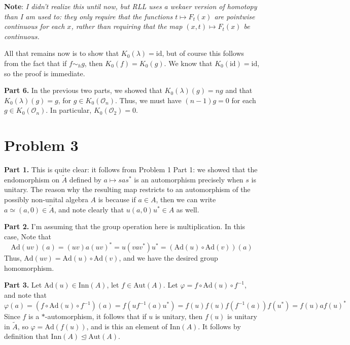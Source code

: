 \documentclass[aps,pra,showpacs,notitlepage,onecolumn,superscriptaddress,nofootinbib]{revtex4-1}
\newcommand{\hhrulefill}{\hspace{-1.0em}\hrulefill}
\theoremstyle{definition}
\begin{document}
\noindent \textbf{Note}: \emph{I didn't realize this until now, but RLL uses a wekaer version of homotopy than I am used to: they only require that the functions $t \mapsto F_t(x)$ are pointwise continuous for each $x$,
rather than requiring that the map $(x, t) \mapsto F_t(x)$ be continuous.}
\newline

\noindent All that remains now is to show that $K_0(\lambda) = \text{id}$, but of course this follows from the fact that if $f \sim_h g$, then $K_0(f) = K_0(g)$. We know that $K_0(\text{id}) = \text{id}$, so the proof is immediate.
\newline

\noindent \textbf{Part 6.} In the previous two parts, we showed that $K_0(\lambda)(g) = ng$ and that $K_0(\lambda)(g) = g$, for $g \in K_0(\mathcal{O}_n)$. Thus, we must have $(n - 1)g = 0$ for each $g \in K_0(\mathcal{O}_n)$. In particular, $K_0(\mathcal{O}_2) = 0$.

\hhrulefill

\section{Problem 3}

\noindent \textbf{Part 1.} This is quite clear: it follows from Problem 1 Part 1: we showed that the endomorphism on $\widetilde{A}$ defined by $a \mapsto s a s^{*}$ is an automorphism precisely when $s$ is unitary.
The reason why the resulting map restricts to an automorphism of the possibly non-unital algebra $A$ is because if $a \in A$, then we can write $a \simeq (a, 0) \in \widetilde{A}$, and note clearly that $u (a, 0) u^{*} \in A$
as well.
\newline

\noindent \textbf{Part 2.} I'm assuming that the group operation here is multiplication. In this case, Note that
$$\text{Ad}(uv)(a) = (uv) a (uv)^{*} = u(v a v^{*}) u^{*} = (\text{Ad}(u) \circ \text{Ad}(v))(a)$$
Thus, $\text{Ad}(uv) = \text{Ad}(u) \circ \text{Ad}(v)$, and we have the desired group homomorphism.
\newline

\noindent \textbf{Part 3.} Let $\text{Ad}(u) \in \text{Inn}(A)$, let $f \in \text{Aut}(A)$. Let $\varphi = f \circ \text{Ad}(u) \circ f^{-1}$, and note that
$$\varphi(a) = (f \circ \text{Ad}(u) \circ f^{-1})(a) = f( u f^{-1}(a) u^{*}) = f(u) f(u) f(f^{-1}(a)) f(u^{*}) = f(u) a f(u)^{*}$$
Since $f$ is a $*$-automorphism, it follows that if $u$ is unitary, then $f(u)$ is unitary in $\widetilde{A}$, so $\varphi = \text{Ad}(f(u))$, and is this an element of $\text{Inn}(A)$.
It follows by definition that $\text{Inn}(A) \trianglelefteq \text{Aut}(A)$.
\newline
\end{document}
